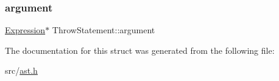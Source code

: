 \subsubsection{\texorpdfstring{argument}{argument}}
{\footnotesize\ttfamily \hyperlink{struct_expression}{Expression}$\ast$ Throw\+Statement\+::argument}



The documentation for this struct was generated from the following file\+:\begin{DoxyCompactItemize}
\item 
src/\hyperlink{ast_8h}{ast.\+h}\end{DoxyCompactItemize}
